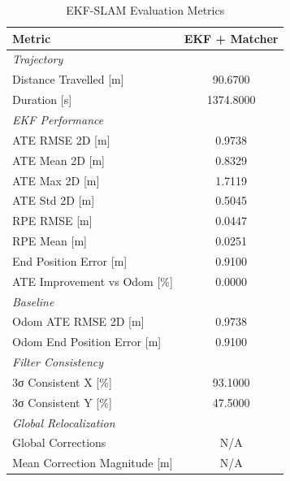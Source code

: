 \begin{table}[htbp]
\centering
\caption{EKF-SLAM Evaluation Metrics}
\label{tab:ekf_results}
\begin{tabular}{lc}
\toprule
Metric & \textbf{EKF + Matcher} \\
\midrule
\multicolumn{2}{l}{\textit{Trajectory}} \\
Distance Travelled [m] & 90.6700 \\
Duration [s] & 1374.8000 \\
\midrule
\multicolumn{2}{l}{\textit{EKF Performance}} \\
ATE RMSE 2D [m] & 0.9738 \\
ATE Mean 2D [m] & 0.8329 \\
ATE Max 2D [m] & 1.7119 \\
ATE Std 2D [m] & 0.5045 \\
RPE RMSE [m] & 0.0447 \\
RPE Mean [m] & 0.0251 \\
End Position Error [m] & 0.9100 \\
ATE Improvement vs Odom [\%] & 0.0000 \\
\midrule
\multicolumn{2}{l}{\textit{Baseline}} \\
Odom ATE RMSE 2D [m] & 0.9738 \\
Odom End Position Error [m] & 0.9100 \\
\midrule
\multicolumn{2}{l}{\textit{Filter Consistency}} \\
3σ Consistent X [\%] & 93.1000 \\
3σ Consistent Y [\%] & 47.5000 \\
\midrule
\multicolumn{2}{l}{\textit{Global Relocalization}} \\
Global Corrections & N/A \\
Mean Correction Magnitude [m] & N/A \\
\midrule
\bottomrule
\end{tabular}
\end{table}